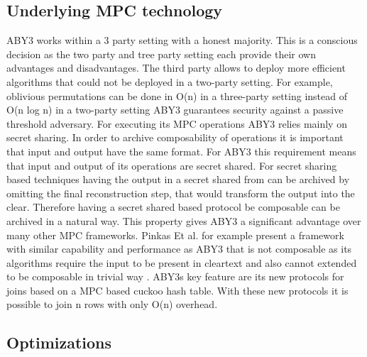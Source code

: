 \subsection{Underlying MPC technology}
ABY3 works within a 3 party setting with a honest majority. This is a conscious decision as the two party and tree party setting each provide their own advantages and disadvantages.
The third party allows to deploy more efficient algorithms that could not be deployed in a two-party setting. For example, oblivious permutations can be done in O(n) in a three-party setting instead of O(n log n) in a two-party setting \cite{mohassel2020fast}
 ABY3 guarantees security against a passive threshold adversary. For executing its MPC operations ABY3 relies mainly on secret sharing. In order to archive composability of operations it is important that input and output have the same format. For ABY3 this requirement means that input and output of its operations are secret shared. For secret sharing based techniques having the output in a secret shared from can be archived by omitting the final  reconstruction step, that would transform the output into the clear. Therefore having a secret shared based protocol be composable can be archived in a natural way. This property gives ABY3 a significant advantage over many other MPC frameworks. Pinkas Et al. \cite{pinkas2014faster} for example present a framework with similar capability and performance as ABY3 that is not composable as its algorithms require the input to be present in cleartext and also cannot extended to be composable in trivial way \cite{mohassel2020fast}.      
  ABY3s key feature are its new protocols for joins based on a MPC based cuckoo hash table. With these new protocols it is possible to join n rows with only O(n) overhead.


\subsection{Optimizations}

